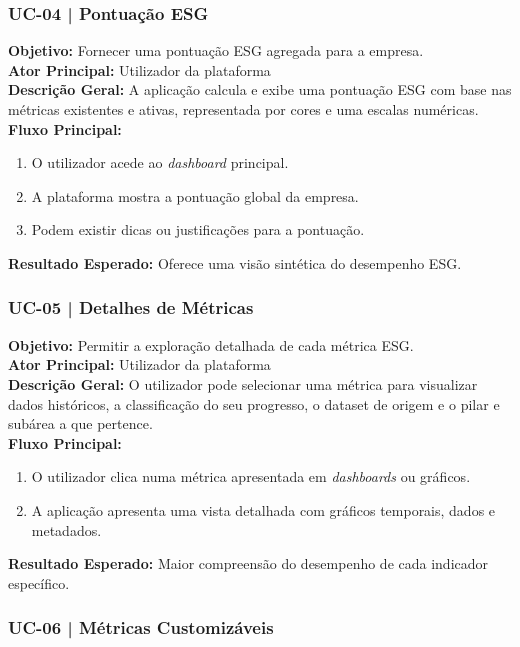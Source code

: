 \subsubsection{UC-04 | Pontuação ESG}

\textbf{Objetivo:} Fornecer uma pontuação ESG agregada para a empresa.\\
\textbf{Ator Principal:} Utilizador da plataforma\\
\textbf{Descrição Geral:} A aplicação calcula e exibe uma pontuação ESG com base nas métricas existentes e ativas, representada por cores e uma escalas numéricas.\\
\textbf{Fluxo Principal:}
\begin{enumerate}
    \item O utilizador acede ao \textit{dashboard} principal.
    \item A plataforma mostra a pontuação global da empresa.
    \item Podem existir dicas ou justificações para a pontuação.
\end{enumerate}
\textbf{Resultado Esperado:} Oferece uma visão sintética do desempenho ESG.

\subsubsection{UC-05 | Detalhes de Métricas}

\textbf{Objetivo:} Permitir a exploração detalhada de cada métrica ESG.\\
\textbf{Ator Principal:} Utilizador da plataforma\\
\textbf{Descrição Geral:} O utilizador pode selecionar uma métrica para visualizar dados históricos, a classificação do seu progresso, o dataset de origem e o pilar e subárea a que pertence.\\
\textbf{Fluxo Principal:}
\begin{enumerate}
    \item O utilizador clica numa métrica apresentada em \textit{dashboards} ou gráficos.
    \item A aplicação apresenta uma vista detalhada com gráficos temporais, dados e metadados.
\end{enumerate}
\textbf{Resultado Esperado:} Maior compreensão do desempenho de cada indicador específico.

\subsubsection{UC-06 | Métricas Customizáveis}

